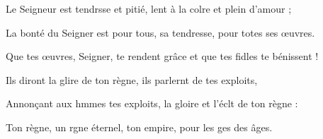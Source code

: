 \item Le Seigneur est tendrsse et pitié,\psstar{} lent à la colre et plein d’amour ;
\item La bonté du Seigner est pour tous,\psstar{} sa tendresse, pour totes ses œuvres.
\item Que tes œuvres, Seigner, te rendent grâce\psstar{} et que tes fidles te bénissent !
\item Ils diront la glire de ton règne,\psstar{} ils parlernt de tes exploits,
\item Annonçant aux hmmes tes exploits,\psstar{} la gloire et l’éclt de ton règne :
\item Ton règne, un rgne éternel,\psstar{} ton empire, pour les ges des âges.